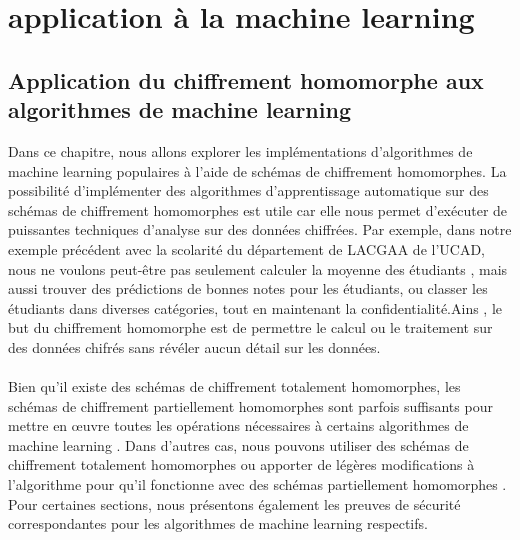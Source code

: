 \documentclass[12pt,a4paper]{report}
\begin{document}
\part{application à la machine learning }
\chapter{Application du chiffrement homomorphe aux algorithmes de machine learning }
Dans ce chapitre, nous allons explorer les implémentations d'algorithmes de machine learning  populaires à l'aide de schémas de chiffrement homomorphes. La possibilité d'implémenter des algorithmes d'apprentissage automatique sur des schémas de chiffrement homomorphes est utile car elle nous permet d'exécuter de puissantes techniques d'analyse sur des données chiffrées. Par exemple, dans notre exemple précédent avec la scolarité du
département de LACGAA de l’UCAD, nous ne voulons peut-être pas seulement calculer la moyenne des étudiants , mais aussi trouver des prédictions de bonnes notes pour les étudiants, ou classer les étudiants dans diverses catégories, tout en maintenant la confidentialité.Ains , le but du chiffrement homomorphe est de permettre le calcul ou le traitement sur des données chifrés sans révéler aucun détail sur les données.
\\
\\
Bien qu'il existe des schémas de chiffrement totalement homomorphes, les schémas de chiffrement partiellement homomorphes sont parfois suffisants pour mettre en œuvre toutes les opérations nécessaires à certains algorithmes de machine learning . Dans d'autres cas, nous pouvons utiliser des schémas de chiffrement totalement homomorphes ou apporter de légères modifications à l'algorithme pour qu'il fonctionne avec des schémas partiellement homomorphes \cite{21}. Pour certaines sections, nous présentons également les preuves de sécurité correspondantes pour les algorithmes de machine learning respectifs.

\\
\\
\printbibliography
\end{document}
